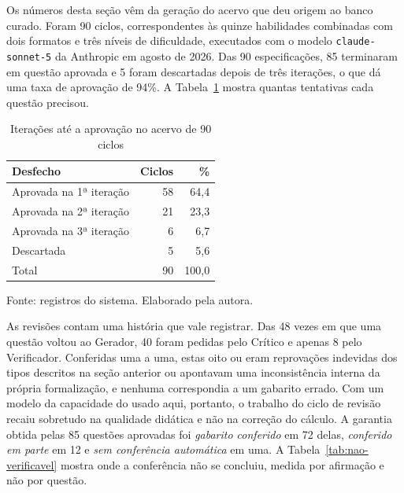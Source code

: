 Os números desta seção vêm da geração do acervo que deu origem ao banco curado. Foram 90 ciclos,
correspondentes às quinze habilidades combinadas com dois formatos e três níveis de dificuldade,
executados com o modelo \texttt{claude-sonnet-5} da Anthropic em agosto de 2026. Das 90
especificações, 85 terminaram em questão aprovada e 5 foram descartadas depois de três iterações,
o que dá uma taxa de aprovação de 94\%. A Tabela~\ref{tab:iteracoes} mostra quantas tentativas
cada questão precisou.

\begin{table}[htbp]
  \centering
  \caption{Iterações até a aprovação no acervo de 90 ciclos}
  \label{tab:iteracoes}
  \begin{tabular}{lrr}
    \toprule
    Desfecho & Ciclos & \% \\
    \midrule
    Aprovada na 1ª iteração & 58 & 64,4 \\
    Aprovada na 2ª iteração & 21 & 23,3 \\
    Aprovada na 3ª iteração & 6 & 6,7 \\
    Descartada & 5 & 5,6 \\
    \midrule
    Total & 90 & 100,0 \\
    \bottomrule
  \end{tabular}

  \smallskip
  {\footnotesize Fonte: registros do sistema. Elaborado pela autora.}
\end{table}

As revisões contam uma história que vale registrar. Das 48 vezes em que uma questão voltou ao
Gerador, 40 foram pedidas pelo Crítico e apenas 8 pelo Verificador. Conferidas uma a uma, estas
oito ou eram reprovações indevidas dos tipos descritos na seção anterior ou apontavam uma
inconsistência interna da própria formalização, e nenhuma correspondia a um gabarito errado. Com um modelo da capacidade
do usado aqui, portanto, o trabalho do ciclo de revisão recaiu sobretudo na qualidade didática e
não na correção do cálculo. A garantia obtida pelas 85 questões aprovadas foi \emph{gabarito
conferido} em 72 delas, \emph{conferido em parte} em 12 e \emph{sem conferência automática} em
uma. A Tabela~\ref{tab:nao-verificavel} mostra onde a conferência não se concluiu, medida por
afirmação e não por questão.

